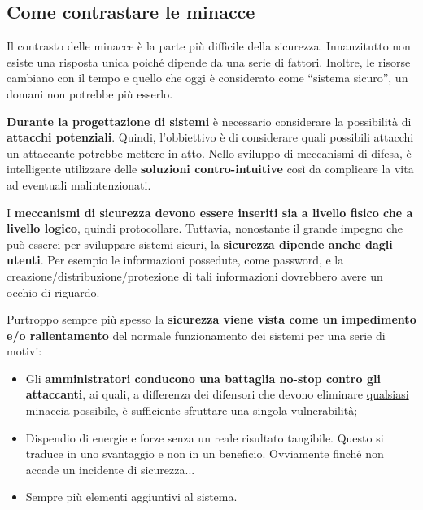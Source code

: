 \documentclass[a4paper]{article}
\newcommand{\dquotes}[1]{``#1''}
\begin{document}
	\subsection{Come contrastare le minacce}\label{come contrastare le minacce}
	
	Il contrasto delle minacce è la parte più difficile della sicurezza. Innanzitutto non esiste una risposta unica poiché dipende da una serie di fattori. Inoltre, le risorse cambiano con il tempo e quello che oggi è considerato come \dquotes{sistema sicuro}, un domani non potrebbe più esserlo.\newline
	
	\noindent
	\textbf{Durante la progettazione di sistemi} è necessario considerare la possibilità di \textbf{attacchi potenziali}. Quindi, l'obbiettivo è di considerare quali possibili attacchi un attaccante potrebbe mettere in atto. Nello sviluppo di meccanismi di difesa, è intelligente utilizzare delle \textbf{soluzioni contro-intuitive} così da complicare la vita ad eventuali malintenzionati.\newline
	
	\noindent
	I \textbf{meccanismi di sicurezza devono essere inseriti sia a livello fisico che a livello logico}, quindi protocollare. Tuttavia, nonostante il grande impegno che può esserci per sviluppare sistemi sicuri, la \textbf{sicurezza dipende anche dagli utenti}. Per esempio le informazioni possedute, come password, e la creazione/distribuzione/protezione di tali informazioni dovrebbero avere un occhio di riguardo.\newline
	
	\noindent
	Purtroppo sempre più spesso la \textbf{sicurezza viene vista come un impedimento e/o rallentamento} del normale funzionamento dei sistemi per una serie di motivi:
	\begin{itemize}
		\item Gli \textbf{amministratori conducono una battaglia no-stop contro gli attaccanti}, ai quali, a differenza dei difensori che devono eliminare \underline{qualsiasi} minaccia possibile, è sufficiente sfruttare una singola vulnerabilità;
		
		\item Dispendio di energie e forze senza un reale risultato tangibile. Questo si traduce in uno svantaggio e non in un beneficio. Ovviamente finché non accade un incidente di sicurezza...
		
		\item Sempre più elementi aggiuntivi al sistema.
	\end{itemize}\newpage
	
\end{document}
